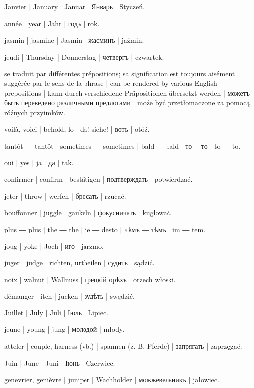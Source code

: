 \begin{outdent}{1em}
Janvier | January | Januar | Январь | Styczeń.

année | year | Jahr | годъ | rok.

jasmin | jasmine | Jasmin | жасминъ | jaźmin.

jeudi | Thursday | Donnerstag | четвергъ | czwartek.

se traduit par différentes prépositions; sa signification est
toujours aisément suggérée par le sens de la phrase | can be rendered
by various English prepositions | kann durch verschiedene
Präpositionen übersetzt werden | можетъ быть переведено различными
предлогами | moźe być przetłomaczone za pomocą róźnych przyimków.

voilà, voici | behold, lo | da! siehe! | вотъ | otóź.

\uvsubentry{}
tantôt ― tantôt | sometimes ― sometimes | bald ― bald | то― то | to ― to.

oui | yes | ja | да | tak.

\uvsubentry{}
confirmer | confirm | bestätigen | подтверждать | potwierdzać.

jeter | throw | werfen | бросать | rzucać.

bouffonner | juggle | gaukeln | фокусничать | kuglować.

plus ― plus | the ― the | je ― desto | чѣмъ ―
тѣмъ | im ― tem.

joug | yoke | Joch | иго | jarzmo.

juger | judge | richten, urtheilen | судить | sądzić.

noix | walnut | Wallnuss | грецкій орѣхъ | orzech włoski.

démanger | itch | jucken | зудѣть | swędzić.

Juillet | July | Juli | Іюль | Lipiec.

jeune | young | jung | молодой | młody.

atteler | couple, harness (vb.) | spannen (z. B. Pferde) | запрягать | zaprzęgać.

Juin | June | Juni | Іюнь | Czerwiec.

genevrier, genièvre | juniper | Wachholder | можжевельникъ | jałowiec.


\end{outdent}
